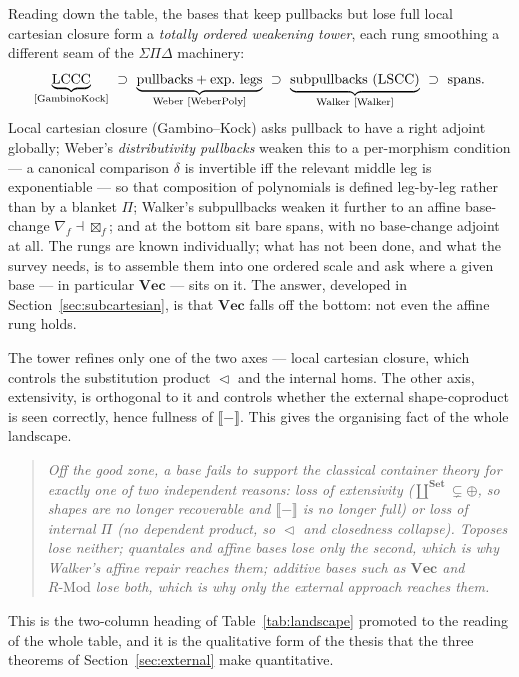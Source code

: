 \documentclass[11pt]{amsart}
\theoremstyle{plain}
\theoremstyle{definition}
\theoremstyle{remark}
\newcommand{\Set}{\mathbf{Set}}
\newcommand{\Vect}{\mathbf{Vec}}
\newcommand{\ext}[1]{\llbracket #1 \rrbracket}
\renewcommand{\lhd}{\vartriangleleft}
\begin{document}
Reading down the table, the bases that keep pullbacks but lose full local cartesian closure form a
\emph{totally ordered weakening tower}, each rung smoothing a different seam of the $\Sigma\Pi\Delta$
machinery:
\[
\underbrace{\text{LCCC}}_{\text{\cite{GambinoKock}}}\ \supset\
\underbrace{\text{pullbacks}+\text{exp.\ legs}}_{\text{Weber \cite{WeberPoly}}}\ \supset\
\underbrace{\text{subpullbacks (LSCC)}}_{\text{Walker \cite{Walker}}}\ \supset\ \text{spans}.
\]
Local cartesian closure (Gambino--Kock) asks pullback to have a right adjoint globally; Weber's
\emph{distributivity pullbacks} \cite{WeberPoly} weaken this to a per-morphism condition --- a
canonical comparison $\delta$ is invertible iff the relevant middle leg is exponentiable --- so that
composition of polynomials is defined leg-by-leg rather than by a blanket $\Pi$; Walker's subpullbacks
\cite{Walker} weaken it further to an affine base-change $\nabla_f\dashv\boxtimes_f$; and at the bottom
sit bare spans, with no base-change adjoint at all. The rungs are known individually; what has not been
done, and what the survey needs, is to assemble them into one ordered scale and ask where a given
base --- in particular $\Vect$ --- sits on it. The answer, developed in
Section~\ref{sec:subcartesian}, is that $\Vect$ falls off the bottom: not even the affine rung holds.

The tower refines only one of the two axes --- local cartesian closure, which controls the
substitution product $\lhd$ and the internal homs. The other axis, extensivity, is orthogonal to it
and controls whether the external shape-coproduct is seen correctly, hence fullness of $\ext{-}$. This
gives the organising fact of the whole landscape.

\begin{quote}
\emph{Off the good zone, a base fails to support the classical container theory for exactly one of two
independent reasons: loss of extensivity ($\coprod^{\Set}\subsetneq\oplus$, so shapes are no longer
recoverable and $\ext{-}$ is no longer full) or loss of internal $\Pi$ (no dependent product, so
$\lhd$ and closedness collapse). Toposes lose neither; quantales and affine bases lose only the
second, which is why Walker's affine repair reaches them; additive bases such as $\Vect$ and
$R\text{-}\mathrm{Mod}$ lose both, which is why only the external approach reaches them.}
\end{quote}

\noindent This is the two-column heading of Table~\ref{tab:landscape} promoted to the reading of the
whole table, and it is the qualitative form of the thesis that the three theorems of
Section~\ref{sec:external} make quantitative.
\end{document}
